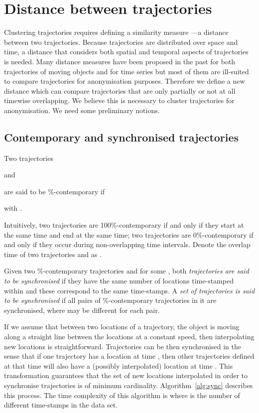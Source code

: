 \section{Distance between trajectories}
\label{sec:distance}

Clustering trajectories requires defining a similarity measure ---a distance
between two trajectories. Because trajectories are distributed over space
and time, a distance that considers both spatial and temporal aspects of
trajectories is needed. Many distance measures have been proposed in the
past for both trajectories of moving objects and for time series but most of them are ill-suited
to compare trajectories for anonymisation purposes.
Therefore we define a new distance which can compare trajectories that are
only partially or not at all timewise overlapping. We believe this is
necessary to cluster trajectories for anonymisation.
We need some preliminary notions.

\subsection{Contemporary and synchronised trajectories}

\begin{definition}
Two trajectories

and

are said to be \%-contemporary if

with .
\end{definition}

Intuitively, two trajectories are 100\%-contemporary if and only if they
start at the same time and end at the same time; two trajectories are
0\%-contemporary if and only if they occur during
non-overlapping time intervals. Denote the overlap time of two trajectories
 and  as .

\begin{definition}
Given two \%-contemporary trajectories  and  for some , both
\emph{trajectories are said to be synchronised} if they have the same number
of locations time-stamped within  and these correspond to the same
time-stamps. A \emph{set of trajectories is said to be synchronised} if all
pairs of \%-contemporary trajectories in it are
synchronised, where  may be different for each pair.
\end{definition}

If we assume that between two locations of a trajectory, the
object is moving along a straight line between the locations at a constant
speed, then interpolating new locations is
straightforward. Trajectories can be then synchronised in the sense that if
one trajectory has a location at time , then other trajectories defined
at that time will also have a (possibly interpolated) location at time .
This transformation
guarantees that the set of new locations interpolated in order to
synchronise trajectories is of minimum cardinality.
Algorithm~\ref{alg:sync} describes
this process.
The time complexity of this algorithm is  where 
is the number of different time-stamps in the data set.

